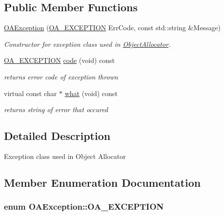 \subsection*{Public Member Functions}
\begin{DoxyCompactItemize}
\item 
\hyperlink{classOAException_a80250ef41d10e8f7e73b9601ca3cdf3d}{O\-A\-Exception} (\hyperlink{classOAException_a7b7c4b5031a4f065e894d02ac7c97a32}{O\-A\-\_\-\-E\-X\-C\-E\-P\-T\-I\-O\-N} Err\-Code, const std\-::string \&Message)
\begin{DoxyCompactList}\small\item\em Constructor for exception class used in \hyperlink{classObjectAllocator}{Object\-Allocator}. \end{DoxyCompactList}\item 
\hyperlink{classOAException_a7b7c4b5031a4f065e894d02ac7c97a32}{O\-A\-\_\-\-E\-X\-C\-E\-P\-T\-I\-O\-N} \hyperlink{classOAException_ad54a0c8dd1deff601e6350e99170febe}{code} (void) const 
\begin{DoxyCompactList}\small\item\em returns error code of exception thrown \end{DoxyCompactList}\item 
virtual const char $\ast$ \hyperlink{classOAException_a599ea1b52cdbd3c2838828ea3a2468ef}{what} (void) const 
\begin{DoxyCompactList}\small\item\em returns string of error that occured \end{DoxyCompactList}\end{DoxyCompactItemize}


\subsection{Detailed Description}
Exception class used in Object Allocator 

\subsection{Member Enumeration Documentation}
\hypertarget{classOAException_a7b7c4b5031a4f065e894d02ac7c97a32}{
\subsubsection[{O\-A\-\_\-\-E\-X\-C\-E\-P\-T\-I\-O\-N}]{\setlength{\rightskip}{0pt plus 5cm}enum {\bf O\-A\-Exception\-::\-O\-A\-\_\-\-E\-X\-C\-E\-P\-T\-I\-O\-N}}}\label{classOAException_a7b7c4b5031a4f065e894d02ac7c97a32}



